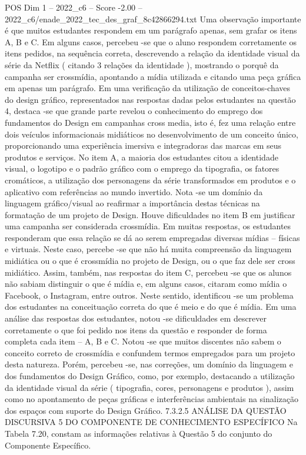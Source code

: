 \begin{textsample}{POS Dim 1 – 2022\_c6 – Score -2.00 – 2022\_c6/enade\_2022\_tec\_des\_graf\_8c42866294.txt}
Uma observação importante é que muitos estudantes respondem em um parágrafo apenas, sem grafar os itens A, B e C.
Em alguns casos, percebeu -se que o aluno respondem corretamente os itens pedidos, na sequência correta, descrevendo a relação da identidade visual da série da Netflix ( citando 3 relações da identidade ), mostrando o porquê da campanha ser crossmídia, apontando a mídia utilizada e citando uma peça gráfica em apenas um parágrafo.
Em uma verificação da utilização de conceitos-chaves do design gráfico, representados nas respostas dadas pelos estudantes na questão 4, destaca -se que grande parte revelou o conhecimento do emprego dos fundamentos do Design em campanhas cross media, isto é, fez uma relação entre dois veículos informacionais midiáticos no desenvolvimento de um conceito único, proporcionando uma experiência imersiva e integradoras das marcas em seus produtos e serviços.
No item A, a maioria dos estudantes citou a identidade visual, o logotipo e o padrão gráfico com o emprego da tipografia, os fatores cromáticos, a utilização dos personagens da série transformados em produtos e o aplicativo com referências ao mundo invertido.
Nota -se um domínio da linguagem gráfico/visual ao reafirmar a importância destas técnicas na formatação de um projeto de Design.
Houve dificuldades no item B em justificar uma campanha ser considerada crossmídia.
Em muitas respostas, os estudantes responderam que essa relação se dá ao serem empregadas diversas mídias – físicas e virtuais.
Neste caso, percebe -se que não há muita compreensão da linguagem midiática ou o que é crossmídia no projeto de Design, ou o que faz dele ser cross midiático.
Assim, também, nas respostas do item C, percebeu -se que os alunos não sabiam distinguir o que é mídia e, em alguns casos, citaram como mídia o Facebook, o Instagram, entre outros.
Neste sentido, identificou -se um problema dos estudantes na conceituação correta do que é meio e do que é mídia.
Em uma análise das respostas dos estudantes, notou -se dificuldades em descrever corretamente o que foi pedido nos itens da questão e responder de forma completa cada item – A, B e C.
Notou -se que muitos discentes não sabem o conceito correto de crossmídia e confundem termos empregados para um projeto desta natureza.
Porém, percebeu -se, nas correções, um domínio da linguagem e dos fundamentos do Design Gráfico, como, por exemplo, destacando a utilização da identidade visual da série ( tipografia, cores, personagens e produtos ), assim como no apontamento de peças gráficas e interferências ambientais na sinalização dos espaços com suporte do Design Gráfico. 7.3.2.5 ANÁLISE DA QUESTÃO DISCURSIVA 5 DO COMPONENTE DE CONHECIMENTO ESPECÍFICO Na Tabela 7.20, constam as informações relativas à Questão 5 do conjunto do Componente Específico.

\end{textsample}
